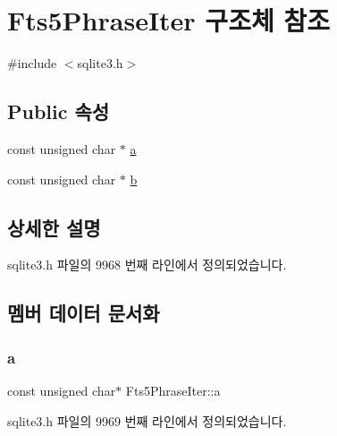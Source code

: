 \hypertarget{struct_fts5_phrase_iter}{}\section{Fts5\+Phrase\+Iter 구조체 참조}
\label{struct_fts5_phrase_iter}


{\ttfamily \#include $<$sqlite3.\+h$>$}

\subsection*{Public 속성}
\begin{DoxyCompactItemize}
\item 
const unsigned char $\ast$ \hyperlink{struct_fts5_phrase_iter_a335969d1ac0fcbb94173c472a3f179ae}{a}
\item 
const unsigned char $\ast$ \hyperlink{struct_fts5_phrase_iter_a459180b0d670604aa38b3ac94be6adda}{b}
\end{DoxyCompactItemize}


\subsection{상세한 설명}


sqlite3.\+h 파일의 9968 번째 라인에서 정의되었습니다.



\subsection{멤버 데이터 문서화}
\mbox{\label{struct_fts5_phrase_iter_a335969d1ac0fcbb94173c472a3f179ae}} 
\subsubsection{\texorpdfstring{a}{a}}
{\footnotesize\ttfamily const unsigned char$\ast$ Fts5\+Phrase\+Iter\+::a}



sqlite3.\+h 파일의 9969 번째 라인에서 정의되었습니다.

\mbox{\label{struct_fts5_phrase_iter_a459180b0d670604aa38b3ac94be6adda}} 

